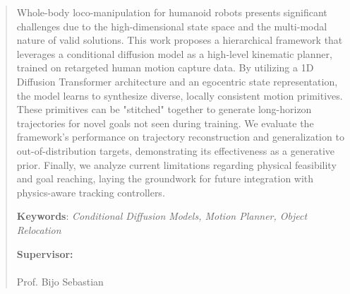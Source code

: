 \documentclass[12pt]{report}
\begin{document}
\begin{abstract}

    \noindent Whole-body loco-manipulation for humanoid robots presents significant challenges due to the high-dimensional state space and the multi-modal nature of valid solutions. This work proposes a hierarchical framework that leverages a conditional diffusion model as a high-level kinematic planner, trained on retargeted human motion capture data. By utilizing a 1D Diffusion Transformer architecture and an egocentric state representation, the model learns to synthesize diverse, locally consistent motion primitives. These primitives can be "stitched" together to generate long-horizon trajectories for novel goals not seen during training. We evaluate the framework's performance on trajectory reconstruction and generalization to out-of-distribution targets, demonstrating its effectiveness as a generative prior. Finally, we analyze current limitations regarding physical feasibility and goal reaching, laying the groundwork for future integration with physics-aware tracking controllers.

 

    \noindent \textbf{Keywords}: \textit{Conditional Diffusion Models, Motion Planner, Object Relocation}

    \vspace{10em}
    
    \noindent
    \textbf{Supervisor:} \\[1.6cm]
    \underline{\hspace{7cm}} \\[0.3cm]
    Prof. Bijo Sebastian

\noindent

\end{abstract}





\thispagestyle{empty} %
\newpage 



\setcounter{page}{1} %



\end{document}
